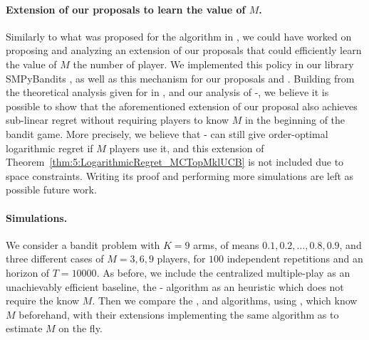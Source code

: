 \paragraph{Extension of our proposals to learn the value of $M$.}

Similarly to what was proposed for the \rhoRandEst{} algorithm in \cite{Anandkumar11}, we could have worked on proposing and analyzing an extension of our proposals that could efficiently learn the value of $M$ the number of player.
We implemented this \rhoRandEst{} policy in our library SMPyBandits \cite{SMPyBandits}, as well as this mechanism for our proposals \RandTopM{} and \MCTopM.
Building from the theoretical analysis given for \rhoRandEst{} in \cite{Anandkumar11}, and our analysis of \MCTopM-\klUCB, we believe it is possible to show that the aforementioned extension of our proposal also achieves sub-linear regret without requiring players to know $M$ in the beginning of the bandit game.
More precisely, we believe that \MCTopM-\klUCB{} can still give order-optimal logarithmic regret if $M$ players use it, and this extension of Theorem~\ref{thm:5:LogarithmicRegret_MCTopMklUCB} is not included due to space constraints.
Writing its proof and performing more simulations are left as possible future work.

\paragraph{Simulations.}

We consider a bandit problem with $K=9$ arms, of means $0.1,0.2,\dots,0.8,0.9$, and three different cases of $M=3,6,9$ players, for $100$ independent repetitions and an horizon of $T=10000$.
As before, we include the centralized multiple-play \klUCB{} as an unachievably efficient baseline, the \Selfish-\klUCB{} algorithm as an heuristic which does not require the know $M$.
Then we compare the \RhoRand, \RandTopM{} and \MCTopM{} algorithms, using \klUCB, which know $M$ beforehand, with their extensions implementing the same algorithm as \rhoRandEst{} to estimate $M$ on the fly.



